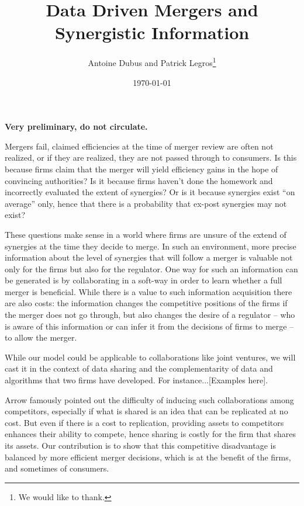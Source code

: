 \documentclass[a4paper,leqno]{article}%
\begin{document}
\title{Data Driven Mergers and Synergistic Information}
\author{Antoine Dubus and Patrick Legros\thanks{We would like to thank.}}
\date{\today}


\maketitle

 
\textbf{Very preliminary, do not circulate.}

\baselineskip0.7cm
Mergers fail, claimed efficiencies at the time of merger review are often not realized, or if they are realized, they are not passed through to consumers. Is this because firms claim that the merger will yield efficiency gains in the hope of convincing authorities? Is it because firms haven't done the homework and incorrectly evaluated the extent of synergies? Or is it because synergies exist ``on average'' only, hence that there is a probability that ex-post synergies may not exist?

These questions make sense in a world where firms are unsure of the extend of synergies at the time they decide to merge. In such an environment, more precise information about the level of synergies that will follow a merger is valuable not only for the firms but also for the regulator. One way for such an information can be generated is by collaborating in a soft-way in order to learn whether a full merger is beneficial. While there is a value to such information acquisition there are also costs: the information changes the competitive positions of the firms if the merger does not go through, but also changes the desire of a regulator -- who is aware of this information or can infer it from the decisions of firms to merge -- to allow the merger.

While our model could be applicable to collaborations like  joint ventures, we will cast it in the context of data sharing and the complementarity of data and algorithms that two firms have developed.  For instance...[Examples here].

Arrow famously pointed out the difficulty of inducing such collaborations among competitors, especially if what is shared is an idea that can be replicated at no cost. But even if there is a cost to replication, providing assets to competitors enhances their ability to compete, hence sharing is costly for the firm that shares its assets. Our contribution is to show that this competitive disadvantage is balanced by more efficient merger decisions, which is at the benefit of the firms, and sometimes of consumers.
\end{document}
